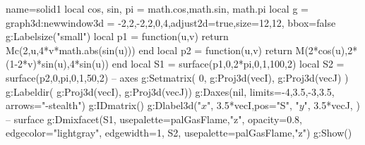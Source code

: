 \documentclass[border=5pt]{standalone}
\begin{document}
\begin{luadraw}{name=solid1}
local cos, sin, pi = math.cos,math.sin, math.pi
local g = graph3d:new{window3d = {-2,2,-2,2,0,4},adjust2d=true,size={12,12}, bbox=false}
g:Labelsize("small") 
local p1 = function(u,v) return Mc(2,u,4*v*math.abs(sin(u))) end
local p2 = function(u,v) return M(2*cos(u),2*(1-2*v)*sin(u),4*sin(u)) end
local S1 = surface(p1,0,2*pi,0,1,{100,2})
local S2 = surface(p2,0,pi,0,1,{50,2})
-- axes
g:Setmatrix( {0, g:Proj3d(vecI), g:Proj3d(vecJ)} )
g:Labeldir( {g:Proj3d(vecI), g:Proj3d(vecJ)})
g:Daxes(nil, {limits={{-4,3.5},{-3,3.5}}, arrows="-stealth"})
g:IDmatrix()
g:Dlabel3d("$x$", 3.5*vecI,{pos="S"}, "$y$", 3.5*vecJ, {}) 
-- surface
g:Dmixfacet(S1, {usepalette={palGasFlame,"z"}, opacity=0.8, edgecolor="lightgray", edgewidth=1}, S2, {usepalette={palGasFlame,"z"}})
g:Show()
\end{luadraw}
\end{document}

